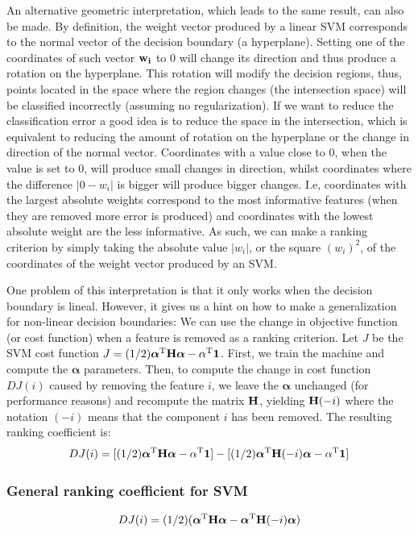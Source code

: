 An alternative geometric interpretation, which leads to the same result, can also be made. By definition, the weight vector produced by a linear SVM corresponds to the normal vector of the decision boundary (a hyperplane). Setting one of the coordinates of such vector $\mathbf{w_i}$ to $0$ will change its direction and thus produce a rotation on the hyperplane. This rotation will modify the decision regions, thus, points located in the space where the region changes (the intersection space) will be classified incorrectly (assuming no regularization). If we want to reduce the classification error a good idea is to reduce the space in the intersection, which is equivalent to reducing the amount of rotation on the hyperplane or the change in direction of the normal vector. Coordinates with a value close to $0$, when the value is set to $0$, will produce small changes in direction, whilst coordinates where the difference $|0 - w_i|$ is bigger will produce bigger changes. I.e, coordinates with the largest absolute weights correspond to the most informative features (when they are removed more error is produced) and coordinates with the lowest absolute weight are the less informative. As such, we can make a ranking criterion by simply taking the absolute value $|w_i|$, or the square $(w_i)^2$, of the coordinates of the weight vector produced by an SVM.

One problem of this interpretation is that it only works when the decision bound\-ary is lineal. However, it gives us a hint on how to make a generalization for non-linear decision boundaries: We can use the change in objective function (or cost function) when a feature is removed as a ranking criterion. Let $J$ be the SVM cost function $J = (1/2) \boldsymbol{\alpha}^{\text{T}} \mathbf{H} \boldsymbol{\alpha} - \alpha^{\text{T}} \mathbf{1}$. First, we train the machine and compute the $\boldsymbol{\alpha}$ parameters. Then, to compute the change in cost function $DJ(i)$ caused by removing the feature $i$, we leave the $\boldsymbol{\alpha}$ unchanged (for performance reasons) and recompute the matrix $\mathbf{H}$, yielding $\mathbf{H}(-i)$ where the notation $(-i)$ means that the component $i$ has been removed. The resulting ranking coefficient is:
\begin{align*}
    DJ(i) = [(1/2) \boldsymbol{\alpha}^{\text{T}} \mathbf{H} \boldsymbol{\alpha} - \alpha^{\text{T}} \mathbf{1}]
     - [(1/2) \boldsymbol{\alpha}^{\text{T}} \mathbf{H}(-i) \boldsymbol{\alpha} - \alpha^{\text{T}} \mathbf{1}]
\end{align*}

\subsubsection*{General ranking coefficient for SVM}
\label{eq:ch4.grankingcoeff}
\begin{align}
    DJ(i) = (1/2)(\boldsymbol{\alpha}^{\text{T}} \mathbf{H} \boldsymbol{\alpha} - \boldsymbol{\alpha}^{\text{T}} \mathbf{H}(-i) \boldsymbol{\alpha})
\end{align}


